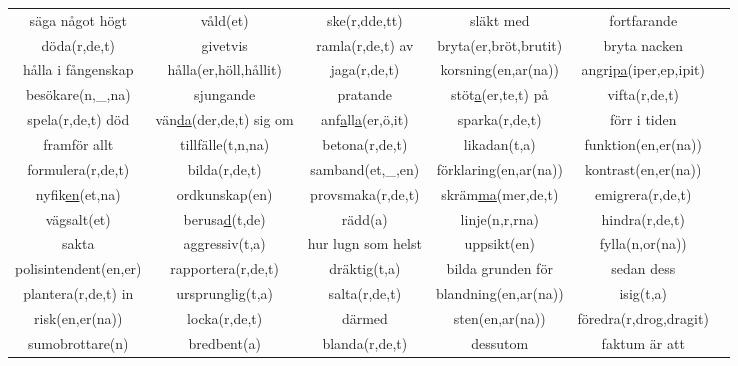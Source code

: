 \begin{center}
\begin{adjustwidth}{-2.7cm}{}
\begin{tabular}{|c c c c c c|}
            säga något högt & våld(et) & ske(r,dde,tt) & släkt med & fortfarande &  \\
            döda(r,de,t) & givetvis & ramla(r,de,t) av & bryta(er,bröt,brutit) & bryta nacken &  \\
            hålla i fångenskap & hålla(er,höll,hållit) & jaga(r,de,t) & korsning(en,ar(na)) & angr\underline{ipa}(iper,ep,ipit) &  \\
            besökare(n,\_,na) & sjungande & pratande & stöt\underline{a}(er,te,t) på & vifta(r,de,t) &  \\
            spela(r,de,t) död & vän\underline{da}(der,de,t) sig om & anf\underline{a}ll\underline{a}(er,ö,it) & sparka(r,de,t) & förr i tiden &  \\
            framför allt & tillfälle(t,n,na) & betona(r,de,t) & likadan(t,a) & funktion(en,er(na)) &  \\
            formulera(r,de,t) & bilda(r,de,t) & samband(et,\_,en) & förklaring(en,ar(na)) & kontrast(en,er(na)) &  \\
            nyfik\underline{en}(et,na) & ordkunskap(en) & provsmaka(r,de,t) & skräm\underline{ma}(mer,de,t) & emigrera(r,de,t) &  \\
            vägsalt(et) & berusa\underline{d}(t,de) & rädd(a) & linje(n,r,rna) & hindra(r,de,t) &  \\
            sakta & aggressiv(t,a) & hur lugn som helst & uppsikt(en) & fylla(n,or(na)) &  \\
            polisintendent(en,er) & rapportera(r,de,t) & dräktig(t,a) & bilda grunden för & sedan dess &  \\
            plantera(r,de,t) in & ursprunglig(t,a) & salta(r,de,t) & blandning(en,ar(na)) & isig(t,a) &  \\
            risk(en,er(na)) & locka(r,de,t) & därmed & sten(en,ar(na)) & föredra(r,drog,dragit) &  \\
            sumobrottare(n) & bredbent(a) & blanda(r,de,t) & dessutom & faktum är att &  \\
            \hline
        \end{tabular}
    \end{adjustwidth}
\end{center}


